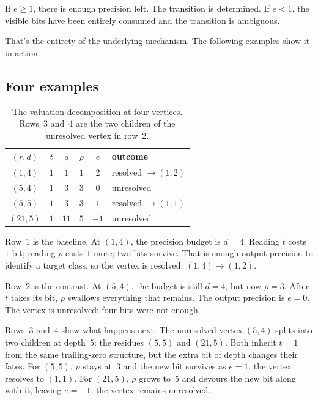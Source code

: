 \documentclass[11pt]{amsart}
\theoremstyle{definition}
\theoremstyle{remark}
\begin{document}
If $e\ge1$, there is enough precision left.  The transition is determined.  If $e<1$, the visible bits have been entirely consumed and the transition is ambiguous.

That's the entirety of the underlying mechanism. The following examples show it in action.

\subsection{Four examples}\label{subsec:examples}

\begin{table}[htbp]
\centering
\renewcommand{\arraystretch}{1.15}
\begin{tabular}{cccccl}
\toprule
$(r,d)$ & $t$ & $q$ & $\rho$ & $e$ & outcome \\
\midrule
$(1,4)$ & $1$ & $1$ & $1$ & $2$ & resolved $\to(1,2)$ \\
$(5,4)$ & $1$ & $3$ & $3$ & $0$ & unresolved \\
$(5,5)$ & $1$ & $3$ & $3$ & $1$ & resolved $\to(1,1)$ \\
$(21,5)$ & $1$ & $11$ & $5$ & $-1$ & unresolved \\
\bottomrule
\end{tabular}
\smallskip
\caption{The valuation decomposition at four vertices.  Rows~3 and~4 are the two children of the unresolved vertex in row~2.}
\label{tab:examples}
\end{table}

Row~1 is the baseline.  At $(1,4)$, the precision budget is $d=4$.  Reading $t$ costs $1$ bit; reading $\rho$ costs $1$ more; two bits survive.  That is enough output precision to identify a target class, so the vertex is resolved: $(1,4)\to(1,2)$.

Row~2 is the contrast.  At $(5,4)$, the budget is still $d=4$, but now $\rho=3$.  After $t$ takes its bit, $\rho$ swallows everything that remains.  The output precision is $e=0$.  The vertex is unresolved: four bits were not enough.

Rows~3 and~4 show what happens next.  The unresolved vertex $(5,4)$ splits into two children at depth~$5$: the residues $(5,5)$ and $(21,5)$.  Both inherit $t=1$ from the same trailing-zero structure, but the extra bit of depth changes their fates.  For $(5,5)$, $\rho$ stays at~$3$ and the new bit survives as $e=1$: the vertex resolves to $(1,1)$.  For $(21,5)$, $\rho$ grows to~$5$ and devours the new bit along with it, leaving $e=-1$: the vertex remains unresolved.
\end{document}
